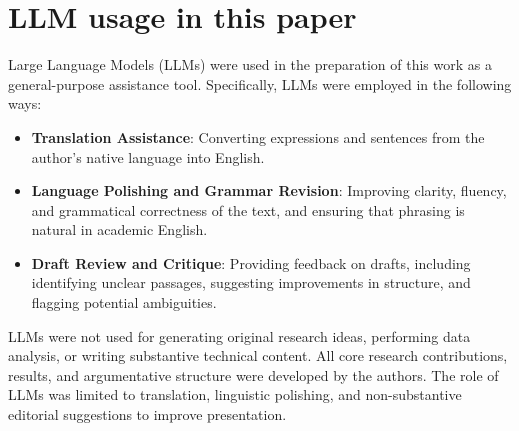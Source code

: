 \section{LLM usage in this paper} \label{apd:llm_usage}


Large Language Models (LLMs) were used in the preparation of this work as a general-purpose assistance tool. Specifically, LLMs were employed in the following ways:
\begin{itemize}
    \item \textbf{Translation Assistance}: Converting expressions and sentences from the author’s native language into English.
    \item \textbf{Language Polishing and Grammar Revision}: Improving clarity, fluency, and grammatical correctness of the text, and ensuring that phrasing is natural in academic English.
    \item \textbf{Draft Review and Critique}: Providing feedback on drafts, including identifying unclear passages, suggesting improvements in structure, and flagging potential ambiguities.
\end{itemize}

LLMs were not used for generating original research ideas, performing data analysis, or writing substantive technical content. All core research contributions, results, and argumentative structure were developed by the authors. The role of LLMs was limited to translation, linguistic polishing, and non-substantive editorial suggestions to improve presentation. 

